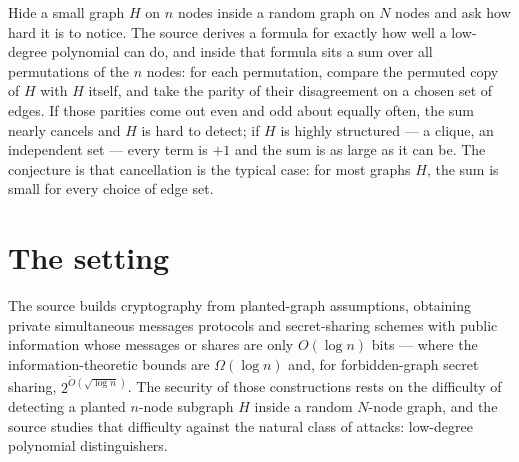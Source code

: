 \documentclass{aicr-conjecture}
\newcommand{\Sym}{\mathrm{Sym}}
\begin{document}
\cjsubtitle{$\sum_{\pi \in \Sym(n)} (-1)^{\langle \pi \circ H + H,
  \alpha\rangle}$ is small, for most $H$ and every $\alpha$}

\vspace{0.4em}

\begin{informalconjecture}
Hide a small graph $H$ on $n$ nodes inside a random graph on $N$ nodes and
ask how hard it is to notice. The source derives a formula for exactly
how well a low-degree polynomial can do, and inside that formula sits a
sum over all permutations of the $n$ nodes: for each permutation, compare
the permuted copy of $H$ with $H$ itself, and take the parity of their
disagreement on a chosen set of edges. If those parities come out even
and odd about equally often, the sum nearly cancels and $H$ is hard to
detect; if $H$ is highly structured --- a clique, an independent set --- every
term is $+1$ and the sum is as large as it can be. The conjecture is that
cancellation is the typical case: for most graphs $H$, the sum is small
for every choice of edge set.
\end{informalconjecture}

\section{The setting}\label{sec:setting}

The source builds cryptography from planted-graph assumptions, obtaining
private simultaneous messages protocols and secret-sharing schemes with
public information whose messages or shares are only $O(\log n)$ bits ---
where the information-theoretic bounds are $\Omega(\log n)$ and, for
forbidden-graph secret sharing, $2^{\widetilde O(\sqrt{\log n})}$. The
security of those constructions rests on the difficulty of detecting a
planted $n$-node subgraph $H$ inside a random $N$-node graph, and the
source studies that difficulty against the natural class of attacks:
low-degree polynomial distinguishers.
\end{document}
